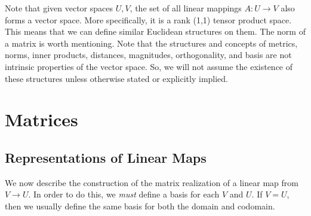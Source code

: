 \documentclass{article}
\begin{document}
  Note that given vector spaces $U, V$, the set of all linear mappings $A: U \longrightarrow V$ also forms a vector space. More specifically, it is a rank (1,1) tensor product space. This means that we can define similar Euclidean structures on them. The norm of a matrix is worth mentioning. Note that the structures and concepts of metrics, norms, inner products, distances, magnitudes, orthogonality, and basis are not intrinsic properties of the vector space. So, we will not assume the existence of these structures unless otherwise stated or explicitly implied. 

\section{Matrices}

  \subsection{Representations of Linear Maps} 

    We now describe the construction of the matrix realization of a linear map from $V \longrightarrow U$. In order to do this, we \textit{must} define a basis for each $V$ and $U$. If $V = U$, then we usually define the same basis for both the domain and codomain. 
\end{document}
